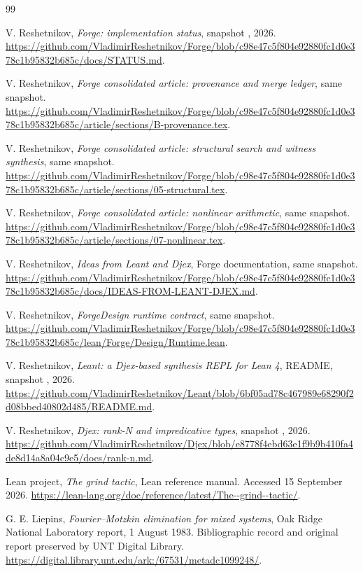 \begin{thebibliography}{99}
V. Reshetnikov, \emph{Forge: implementation status}, snapshot
, 2026.
\url{https://github.com/VladimirReshetnikov/Forge/blob/c98e47c5f804e92880fc1d0e378c1b95832b685c/docs/STATUS.md}.

V. Reshetnikov, \emph{Forge consolidated article: provenance and merge ledger}, same snapshot.
\url{https://github.com/VladimirReshetnikov/Forge/blob/c98e47c5f804e92880fc1d0e378c1b95832b685c/article/sections/B-provenance.tex}.

V. Reshetnikov, \emph{Forge consolidated article: structural search and witness synthesis}, same snapshot.
\url{https://github.com/VladimirReshetnikov/Forge/blob/c98e47c5f804e92880fc1d0e378c1b95832b685c/article/sections/05-structural.tex}.

V. Reshetnikov, \emph{Forge consolidated article: nonlinear arithmetic}, same snapshot.
\url{https://github.com/VladimirReshetnikov/Forge/blob/c98e47c5f804e92880fc1d0e378c1b95832b685c/article/sections/07-nonlinear.tex}.

V. Reshetnikov, \emph{Ideas from Leant and Djex}, Forge documentation, same snapshot.
\url{https://github.com/VladimirReshetnikov/Forge/blob/c98e47c5f804e92880fc1d0e378c1b95832b685c/docs/IDEAS-FROM-LEANT-DJEX.md}.

V. Reshetnikov, \emph{ForgeDesign runtime contract}, same snapshot.
\url{https://github.com/VladimirReshetnikov/Forge/blob/c98e47c5f804e92880fc1d0e378c1b95832b685c/lean/Forge/Design/Runtime.lean}.

V. Reshetnikov, \emph{Leant: a Djex-based synthesis REPL for Lean 4}, README, snapshot
, 2026.
\url{https://github.com/VladimirReshetnikov/Leant/blob/6bf05ad78c467989e68290f2d08bbed40802d485/README.md}.

V. Reshetnikov, \emph{Djex: rank-N and impredicative types}, snapshot
, 2026.
\url{https://github.com/VladimirReshetnikov/Djex/blob/e8778f4ebd63e1f9b9b410fa4de8d14a8a04c9e5/docs/rank-n.md}.

Lean project, \emph{The grind tactic}, Lean reference manual. Accessed 15 September 2026.
\url{https://lean-lang.org/doc/reference/latest/The--grind--tactic/}.

G. E. Liepins, \emph{Fourier--Motzkin elimination for mixed systems}, Oak Ridge National Laboratory report, 1 August 1983. Bibliographic record and original report preserved by UNT Digital Library.
\url{https://digital.library.unt.edu/ark:/67531/metadc1099248/}.


\end{thebibliography}
